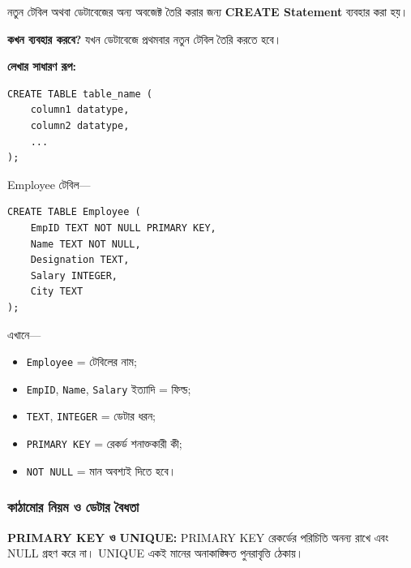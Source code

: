 \begin{definitionbox}{}

নতুন টেবিল অথবা ডেটাবেজের অন্য অবজেক্ট তৈরি করার জন্য
\textbf{CREATE Statement} ব্যবহার করা হয়।

\end{definitionbox}

\textbf{কখন ব্যবহার করবে?} যখন ডেটাবেজে প্রথমবার নতুন টেবিল তৈরি করতে হবে।

\textbf{লেখার সাধারণ রূপ:}

\par\noindent\begin{minipage}{\linewidth}
\begin{verbatim}
CREATE TABLE table_name (
    column1 datatype,
    column2 datatype,
    ...
);
\end{verbatim}
\end{minipage}\par

Employee টেবিল—

\par\noindent\begin{minipage}{\linewidth}
\begin{verbatim}
CREATE TABLE Employee (
    EmpID TEXT NOT NULL PRIMARY KEY,
    Name TEXT NOT NULL,
    Designation TEXT,
    Salary INTEGER,
    City TEXT
);
\end{verbatim}
\end{minipage}\par

এখানে—

\begin{itemize}

\item \texttt{Employee} = টেবিলের নাম;

\item \texttt{EmpID}, \texttt{Name}, \texttt{Salary} ইত্যাদি = ফিল্ড;

\item \texttt{TEXT}, \texttt{INTEGER} = ডেটার ধরন;

\item \texttt{PRIMARY KEY} = রেকর্ড শনাক্তকারী কী;

\item \texttt{NOT NULL} = মান অবশ্যই দিতে হবে।

\end{itemize}

\subsubsection{কাঠামোর নিয়ম ও ডেটার বৈধতা}
\textbf{PRIMARY KEY ও UNIQUE:} PRIMARY KEY রেকর্ডের পরিচিতি অনন্য রাখে এবং NULL গ্রহণ করে না। UNIQUE একই মানের অনাকাঙ্ক্ষিত পুনরাবৃত্তি ঠেকায়।

